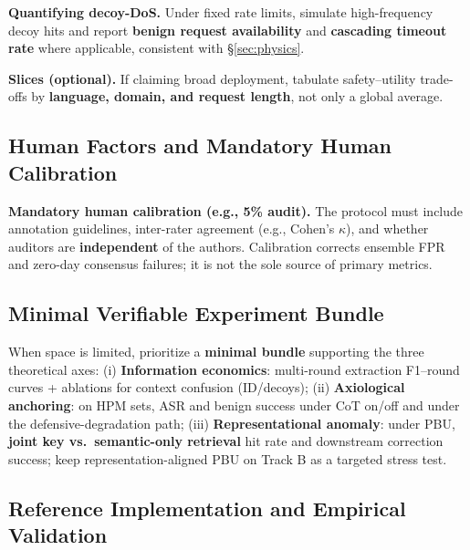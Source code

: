 \documentclass[letterpaper,twocolumn,10pt]{article}
\begin{document}
\textbf{Quantifying decoy-DoS.} Under fixed rate limits, simulate high-frequency decoy hits and report \textbf{benign request availability} and \textbf{cascading timeout rate} where applicable, consistent with \S\ref{sec:physics}.

\textbf{Slices (optional).} If claiming broad deployment, tabulate safety--utility trade-offs by \textbf{language, domain, and request length}, not only a global average.

\subsection{Human Factors and Mandatory Human Calibration}
\label{sec:eval-human}

\textbf{Mandatory human calibration (e.g., 5\% audit).} The protocol must include annotation guidelines, inter-rater agreement (e.g., Cohen's $\kappa$), and whether auditors are \textbf{independent} of the authors. Calibration corrects ensemble FPR and zero-day consensus failures; it is not the sole source of primary metrics.

\subsection{Minimal Verifiable Experiment Bundle}
\label{sec:eval-minimal}

When space is limited, prioritize a \textbf{minimal bundle} supporting the three theoretical axes: (i) \textbf{Information economics}: multi-round extraction F1--round curves + ablations for context confusion (ID/decoys); (ii) \textbf{Axiological anchoring}: on HPM sets, ASR and benign success under CoT on/off and under the defensive-degradation path; (iii) \textbf{Representational anomaly}: under PBU, \textbf{joint key vs.\ semantic-only retrieval} hit rate and downstream correction success; keep representation-aligned PBU on Track B as a targeted stress test.

\subsection{Reference Implementation and Empirical Validation}
\label{sec:eval-artifact}
\end{document}
